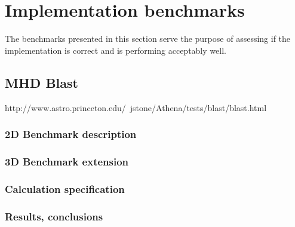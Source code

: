 \section{Implementation benchmarks}
The benchmarks presented in this section serve the purpose of assessing if the implementation is correct and is performing acceptably well.

\subsection{MHD Blast}
http://www.astro.princeton.edu/~jstone/Athena/tests/blast/blast.html

\subsubsection{2D Benchmark description}

\subsubsection{3D Benchmark extension}

\subsubsection{Calculation specification}

\subsubsection{Results, conclusions}